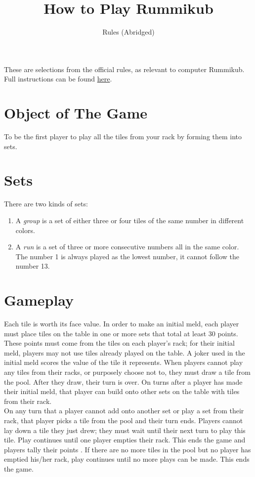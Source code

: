 \documentclass[a4paper,10pt]{article}
\title{How to Play Rummikub}
\date{}
\author{Rules (Abridged)}
\begin{document}
\maketitle
These are selections from the official rules, as relevant to computer Rummikub.
Full instructions can be found \href{https://rummikub.com/rules/}{here}.

\section{Object of The Game}
To be the ﬁrst player to play all the tiles from your rack by forming them into sets.

\section{Sets}\label{sets}
There are two kinds of sets:
\begin{enumerate}
 \item A \emph{group} is a set of either three or four tiles of the same number in different colors.
 \item A \emph{run} is a set of three or more consecutive numbers all in the same color. The number 1 is always played as the lowest number, it cannot follow the number 13.
\end{enumerate}

\section{Gameplay}
Each tile is worth its face value. In order to make an initial meld, each player must place tiles on the table in one or more sets that total at least 30 points. These points must come from the tiles on each player’s rack; for their initial meld, players may not use tiles already played on the table. A joker used in the initial meld scores the value of the tile it represents. When players cannot play any tiles from their racks, or purposely choose not to, they must draw a tile from the pool. After they draw, their turn is over. On turns after a player has made their initial meld, that player can build onto other sets on the table with tiles from their rack.\\
On any turn that a player cannot add onto another set or play a set from their rack, that player picks a tile from the pool and their turn ends. Players cannot lay down a tile they just drew; they must wait until their next turn to play this tile. Play continues until one player empties their rack. This ends the game and players tally their points
. If there are no more tiles in the pool but no player has emptied his/her rack, play continues until no more plays can be made. This ends the game.
\end{document}
